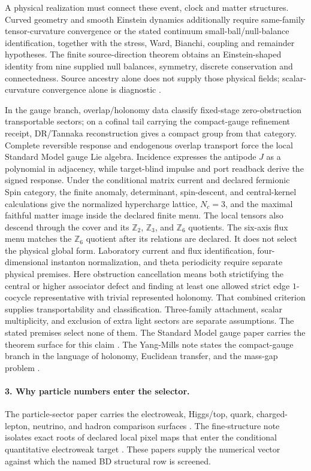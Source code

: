 \documentclass[11pt]{article}
\theoremstyle{remark}
\theoremstyle{plain}
\begin{document}
A physical realization must connect these event, clock and matter structures.
Curved geometry and smooth Einstein dynamics additionally require same-family
tensor-curvature convergence or the stated continuum small-ball/null-balance
identification, together with the stress, Ward, Bianchi, coupling and remainder
hypotheses. The finite source-direction theorem obtains an Einstein-shaped
identity from nine supplied null balances, symmetry, discrete conservation
and connectedness. Source ancestry alone does not supply those physical
fields; scalar-curvature convergence alone is diagnostic
\cite{OPHScreenMicrophysics}.

In the gauge branch, overlap/holonomy data classify
fixed-stage zero-obstruction transportable sectors; on a cofinal tail carrying the compact-gauge
refinement receipt, DR/Tannaka reconstruction gives a compact group from that
category. Complete reversible response and endogenous overlap transport
force the local Standard Model gauge Lie algebra. Incidence expresses the antipode \(J\) as
a polynomial in adjacency, while target-blind impulse and port readback
derive the signed response. Under the conditional matrix current and declared
fermionic Spin category, the finite anomaly, determinant, spin-descent, and
central-kernel calculations give the normalized hypercharge lattice, \(N_c=3\), and the maximal
faithful matter image inside the declared finite menu. The local tensors also descend through the cover and its
\(\mathbb Z_2\), \(\mathbb Z_3\), and \(\mathbb Z_6\) quotients. The
six-axis flux menu matches the \(\mathbb Z_6\) quotient after its relations
are declared. It does not select the physical global form. Laboratory
current and flux identification, four-dimensional
instanton normalization, and theta periodicity require separate physical
premises.
Here obstruction cancellation means both strictifying the central or higher associator defect and
finding at least one allowed strict edge \(1\)-cocycle representative with trivial represented
holonomy. That combined
criterion supplies transportability and classification. Three-family attachment, scalar
multiplicity, and exclusion of extra light sectors are separate assumptions.
The stated premises select none of them.
The Standard Model gauge paper carries the theorem surface for this claim \cite{OPHGaugeCore}. The Yang-Mills note
states the compact-gauge branch in the language of holonomy, Euclidean transfer, and the mass-gap
problem \cite{OPHYangMillsGap}.

\paragraph{3. Why particle numbers enter the selector.}
The particle-sector paper carries the electroweak, Higgs/top, quark, charged-lepton, neutrino, and
hadron comparison surfaces \cite{OPHParticleZoo}. The fine-structure note isolates exact roots of
declared local pixel maps that enter the conditional quantitative electroweak target
\cite{OPHFineStructure}. These papers supply
the numerical vector against which the named BD structural row is screened.
\end{document}
